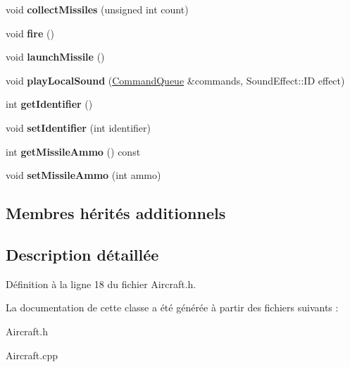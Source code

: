 \begin{DoxyCompactItemize}
void {\bfseries collect\+Missiles} (unsigned int count)
\item 
\hypertarget{class_aircraft_a8ea011c4732eb38c9dc9872a24d2227c}{}\label{class_aircraft_a8ea011c4732eb38c9dc9872a24d2227c} 
void {\bfseries fire} ()
\item 
\hypertarget{class_aircraft_a3bd9289d3c789cbb0aa3abe53a5da52e}{}\label{class_aircraft_a3bd9289d3c789cbb0aa3abe53a5da52e} 
void {\bfseries launch\+Missile} ()
\item 
\hypertarget{class_aircraft_a604ac5c8004f6a94d5b9222ed0c4c79a}{}\label{class_aircraft_a604ac5c8004f6a94d5b9222ed0c4c79a} 
void {\bfseries play\+Local\+Sound} (\hyperlink{class_command_queue}{Command\+Queue} \&commands, Sound\+Effect\+::\+ID effect)
\item 
\hypertarget{class_aircraft_a2f6a97f09252744828f748120025630b}{}\label{class_aircraft_a2f6a97f09252744828f748120025630b} 
int {\bfseries get\+Identifier} ()
\item 
\hypertarget{class_aircraft_a56692fd9bd62cfb642320d462ce9c5d7}{}\label{class_aircraft_a56692fd9bd62cfb642320d462ce9c5d7} 
void {\bfseries set\+Identifier} (int identifier)
\item 
\hypertarget{class_aircraft_a341876d4692fd3da07058d545ee44da7}{}\label{class_aircraft_a341876d4692fd3da07058d545ee44da7} 
int {\bfseries get\+Missile\+Ammo} () const
\item 
\hypertarget{class_aircraft_ac57cbf96490c9ae413bf7c3027a5aedb}{}\label{class_aircraft_ac57cbf96490c9ae413bf7c3027a5aedb} 
void {\bfseries set\+Missile\+Ammo} (int ammo)
\end{DoxyCompactItemize}
\subsection*{Membres hérités additionnels}


\subsection{Description détaillée}


Définition à la ligne 18 du fichier Aircraft.\+h.



La documentation de cette classe a été générée à partir des fichiers suivants \+:\begin{DoxyCompactItemize}
\item 
Aircraft.\+h\item 
Aircraft.\+cpp\end{DoxyCompactItemize}
